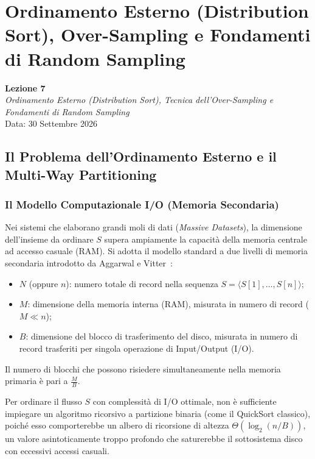 \chapter{Ordinamento Esterno (Distribution Sort), Over-Sampling e Fondamenti di Random Sampling}
\label{chap:external-distribution-sort}

\begin{center}
  \textbf{Lezione 7}\\
  \emph{Ordinamento Esterno (Distribution Sort), Tecnica dell'Over-Sampling e Fondamenti di Random Sampling}\\[0.5em]
  Data: 30 Settembre 2026
\end{center}

\section{Il Problema dell'Ordinamento Esterno e il Multi-Way Partitioning}
\label{sec:external-sorting-multiway}

\subsection{Il Modello Computazionale I/O (Memoria Secondaria)}
Nei sistemi che elaborano grandi moli di dati (\textit{Massive Datasets}), la dimensione dell'insieme da ordinare $S$ supera ampiamente la capacità della memoria centrale ad accesso casuale (RAM). Si adotta il modello standard a due livelli di memoria secondaria introdotto da Aggarwal e Vitter~\cite{aggarwal1988}:
\begin{itemize}
  \item $N$ (oppure $n$): numero totale di record nella sequenza $S = \langle S[1], \dots, S[n] \rangle$;
  \item $M$: dimensione della memoria interna (RAM), misurata in numero di record ($M \ll n$);
  \item $B$: dimensione del blocco di trasferimento del disco, misurata in numero di record trasferiti per singola operazione di Input/Output (I/O).
\end{itemize}

Il numero di blocchi che possono risiedere simultaneamente nella memoria primaria è pari a $\frac{M}{B}$.

Per ordinare il flusso $S$ con complessità di I/O ottimale, non è sufficiente impiegare un algoritmo ricorsivo a partizione binaria (come il QuickSort classico), poiché esso comporterebbe un albero di ricorsione di altezza $\Theta(\log_2(n/B))$, un valore asintoticamente troppo profondo che saturerebbe il sottosistema disco con eccessivi accessi casuali. 

